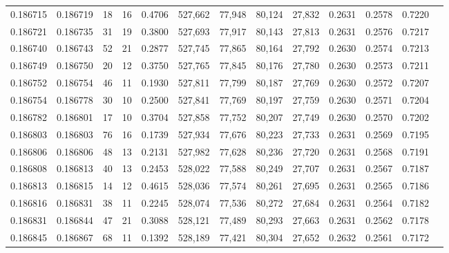 \begin{tabular}{rrrrrrrrrrrrr}
0.186715 & 0.186719 &    18 &  16 &                                     0.4706 & 527,662 &  77,948 &  80,124 &  27,832 & 0.2631 & 0.2578 & 0.7220 \\
0.186721 & 0.186735 &    31 &  19 &                                     0.3800 & 527,693 &  77,917 &  80,143 &  27,813 & 0.2631 & 0.2576 & 0.7217 \\
0.186740 & 0.186743 &    52 &  21 &                                     0.2877 & 527,745 &  77,865 &  80,164 &  27,792 & 0.2630 & 0.2574 & 0.7213 \\
0.186749 & 0.186750 &    20 &  12 &                                     0.3750 & 527,765 &  77,845 &  80,176 &  27,780 & 0.2630 & 0.2573 & 0.7211 \\
0.186752 & 0.186754 &    46 &  11 &                                     0.1930 & 527,811 &  77,799 &  80,187 &  27,769 & 0.2630 & 0.2572 & 0.7207 \\
0.186754 & 0.186778 &    30 &  10 &                                     0.2500 & 527,841 &  77,769 &  80,197 &  27,759 & 0.2630 & 0.2571 & 0.7204 \\
0.186782 & 0.186801 &    17 &  10 &                                     0.3704 & 527,858 &  77,752 &  80,207 &  27,749 & 0.2630 & 0.2570 & 0.7202 \\
0.186803 & 0.186803 &    76 &  16 &                                     0.1739 & 527,934 &  77,676 &  80,223 &  27,733 & 0.2631 & 0.2569 & 0.7195 \\
0.186806 & 0.186806 &    48 &  13 &                                     0.2131 & 527,982 &  77,628 &  80,236 &  27,720 & 0.2631 & 0.2568 & 0.7191 \\
0.186808 & 0.186813 &    40 &  13 &                                     0.2453 & 528,022 &  77,588 &  80,249 &  27,707 & 0.2631 & 0.2567 & 0.7187 \\
0.186813 & 0.186815 &    14 &  12 &                                     0.4615 & 528,036 &  77,574 &  80,261 &  27,695 & 0.2631 & 0.2565 & 0.7186 \\
0.186816 & 0.186831 &    38 &  11 &                                     0.2245 & 528,074 &  77,536 &  80,272 &  27,684 & 0.2631 & 0.2564 & 0.7182 \\
0.186831 & 0.186844 &    47 &  21 &                                     0.3088 & 528,121 &  77,489 &  80,293 &  27,663 & 0.2631 & 0.2562 & 0.7178 \\
0.186845 & 0.186867 &    68 &  11 &                                     0.1392 & 528,189 &  77,421 &  80,304 &  27,652 & 0.2632 & 0.2561 & 0.7172 \\

\end{tabular}
